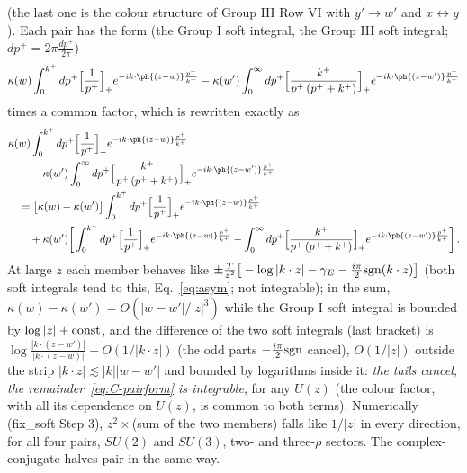 (the last one is the colour structure of Group III Row VI with $y'\to w'$ and $x\leftrightarrow y$). Each pair has the form (the Group I soft integral, the Group III soft integral; $dp^{+}=2\pi\frac{dp^{+}}{2\pi}$)
\begin{align}
\kappa(w)\int_{0}^{k^{+}}dp^{+}\Big[\frac{1}{p^{+}}\Big]_{+}e^{-ik\cdot\ph{(z-w)}\frac{p^{+}}{k^{+}}}-\kappa(w')\int_{0}^{\infty}dp^{+}\Big[\frac{k^{+}}{p^{+}\,(p^{+}+k^{+})}\Big]_{+}e^{-ik\cdot\ph{(z-w')}\frac{p^{+}}{k^{+}}}\notag
\end{align}
times a common factor, which is rewritten exactly as
\begin{align}
&\kappa(w)\int_{0}^{k^{+}}dp^{+}\Big[\frac{1}{p^{+}}\Big]_{+}e^{-ik\cdot\ph{(z-w)}\frac{p^{+}}{k^{+}}}\notag\\
&\qquad-\kappa(w')\int_{0}^{\infty}dp^{+}\Big[\frac{k^{+}}{p^{+}\,(p^{+}+k^{+})}\Big]_{+}e^{-ik\cdot\ph{(z-w')}\frac{p^{+}}{k^{+}}}\notag\\
&\quad=\big[\kappa(w)-\kappa(w')\big]\int_{0}^{k^{+}}dp^{+}\Big[\frac{1}{p^{+}}\Big]_{+}e^{-ik\cdot\ph{(z-w)}\frac{p^{+}}{k^{+}}}\notag\\
&\qquad+\kappa(w')\bigg[\int_{0}^{k^{+}}dp^{+}\Big[\frac{1}{p^{+}}\Big]_{+}e^{-ik\cdot\ph{(z-w)}\frac{p^{+}}{k^{+}}}-\int_{0}^{\infty}dp^{+}\Big[\frac{k^{+}}{p^{+}\,(p^{+}+k^{+})}\Big]_{+}e^{-ik\cdot\ph{(z-w')}\frac{p^{+}}{k^{+}}}\bigg]\,.\label{eq:C-pairform}
\end{align}
At large $z$ each member behaves like $\pm\frac{T}{z^{2}}\big[-\log|k\cdot z|-\gamma_{E}-\frac{i\pi}{2}{\rm sgn}(k\cdot z)\big]$ (both soft integrals tend to this, Eq.~\eqref{eq:asym}; not integrable); in the sum, $\kappa(w)-\kappa(w')=O(|w-w'|/|z|^{3})$ while the Group I soft integral is bounded by $\log|z|+{\rm const}$, and the difference of the two soft integrals (last bracket) is $\log\frac{|k\cdot(z-w')|}{|k\cdot(z-w)|}+O(1/|k\cdot z|)$ (the odd parts $-\frac{i\pi}{2}{\rm sgn}$ cancel), $O(1/|z|)$ outside the strip $|k\cdot z|\lesssim|k||w-w'|$ and bounded by logarithms inside it: \emph{the tails cancel, the remainder~\eqref{eq:C-pairform} is integrable}, for any $U(z)$ (the colour factor, with all its dependence on $U(z)$, is common to both terms). Numerically (fix\_soft Step 3), $z^{2}\times$(sum of the two members) falls like $1/|z|$ in every direction, for all four pairs, $SU(2)$ and $SU(3)$, two- and three-$\rho$ sectors. The complex-conjugate halves pair in the same way.

